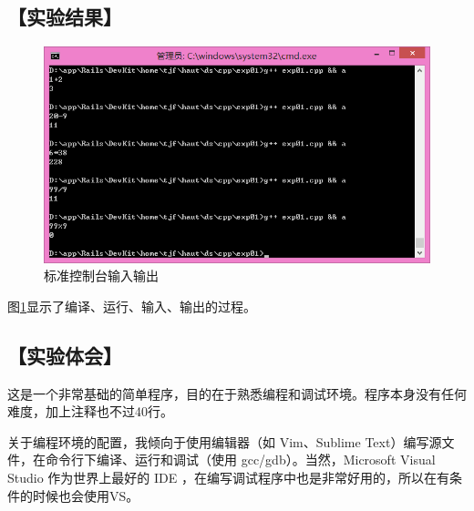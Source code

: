 \subsection*{【实验结果】}
\begin{figure}[htp]
\centering
\includegraphics[width=\textwidth]{exp01/exp01.png}
\caption{\label{out01}标准控制台输入输出}
\end{figure}
图\ref{out01}显示了编译、运行、输入、输出的过程。
\subsection*{【实验体会】}
这是一个非常基础的简单程序，目的在于熟悉编程和调试环境。程序本身没有任何难度，加上注释也不过40行。

关于编程环境的配置，我倾向于使用编辑器（如 Vim、Sublime Text）编写源文件，在命令行下编译、运行和调试（使用 gcc/gdb）。当然，Microsoft Visual Studio 作为世界上最好的 IDE ，在编写调试程序中也是非常好用的，所以在有条件的时候也会使用VS。

\clearpage\newpage
